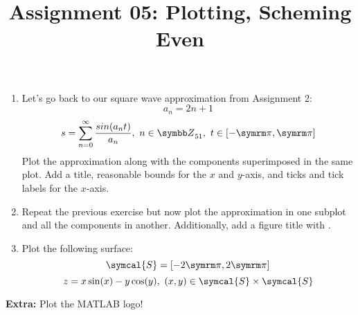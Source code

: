 \documentclass{article}
\title{Assignment 05: Plotting, Scheming Even}
\begin{document}
\renderTitle

\begin{enumerate}[leftmargin=*]
	\item
		Let's go back to our square wave approximation from
		Assignment 2:
		\begin{equation}
			a_n = 2n + 1
		\end{equation}
		\begin{equation}
			s
			=
			\sum_{n = 0}^\infty
			\frac{sin(a_n t)}{a_n},
			\ n \in \Z_{51},
			\ t \in [-\cpi, \cpi]
		\end{equation}
		Plot the approximation along with the components
		superimposed in the same plot.  Add a title, reasonable
		bounds for the \(x\) and \(y\)-axis, and ticks and tick
		labels for the \(x\)-axis.

	\item
		Repeat the previous exercise but now plot the
		approximation in one subplot and all the components in
		another.  Additionally, add a figure title with
		.

	\item
		Plot the following surface:
		\begin{equation}
			\symcal{S} = [-2\cpi, 2\cpi]
		\end{equation}
		\begin{equation}
			z = x\sin(x) - y\cos(y),
			\ (x, y) \in \symcal{S} \times \symcal{S}
		\end{equation}
\end{enumerate}

\textbf{Extra:} Plot the MATLAB logo!
\end{document}
